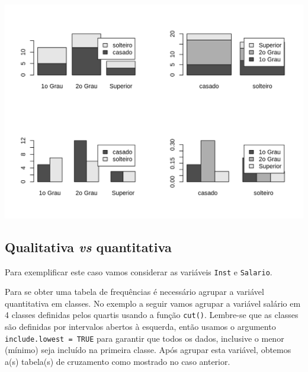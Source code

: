 \documentclass[10pt,a4paper]{book}
\begin{document}
\begin{center}\includegraphics{figures/unnamed-chunk-317-1} \end{center}

\subsection{\texorpdfstring{Qualitativa \emph{vs}
quantitativa}{Qualitativa vs quantitativa}}\label{qualitativa-vs-quantitativa}

Para exemplificar este caso vamos considerar as variáveis \texttt{Inst}
e \texttt{Salario}.

Para se obter uma tabela de frequências é necessário agrupar a variável
quantitativa em classes. No exemplo a seguir vamos agrupar a variável
salário em 4 classes definidas pelos quartis usando a função
\texttt{cut()}. Lembre-se que as classes são definidas por intervalos
abertos à esquerda, então usamos o argumento
\texttt{include.lowest\ =\ TRUE} para garantir que todos os dados,
inclusive o menor (mínimo) seja incluído na primeira classe. Após
agrupar esta variável, obtemos a(s) tabela(s) de cruzamento como
mostrado no caso anterior.
\end{document}
